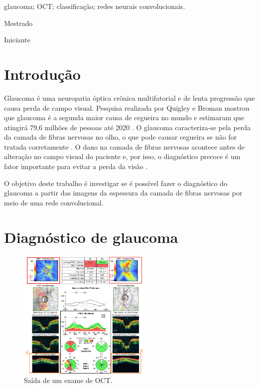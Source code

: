 \documentclass[conference]{IEEEtran}
\begin{document}
\renewcommand\IEEEkeywordsname{Palavras-chave}
\begin{IEEEkeywords}
\label{Palavras-chave}
glaucoma; OCT; classificação; redes neurais convolucionais.
\end{IEEEkeywords}

\renewcommand\IEEEkeywordsname{Classifica\c{c}\~{a}o}
\begin{IEEEkeywords}
	\label{classificacao}
	Mestrado
\end{IEEEkeywords}

\renewcommand\IEEEkeywordsname{Categoria}
\begin{IEEEkeywords}
	\label{Categoria}
	Iniciante 
\end{IEEEkeywords}

\IEEEpeerreviewmaketitle


\section{Introdução}


Glaucoma é uma neuropatia óptica crônica multifatorial e de lenta progressão que causa perda de campo visual. Pesquisa realizada por Quigley e Broman mostrou que glaucoma é a segunda maior causa de cegueira no mundo e estimaram que atingirá 79,6 milhões de pessoas até 2020 \cite{Quigley2006}. O glaucoma caracteriza-se pela perda da camada de fibras nervosas no olho, o que pode causar cegueira se não for tratada corretamente \cite{Quigley2011}. O dano na camada de fibras nervosas acontece antes de alteração no campo visual do paciente e, por isso, o diagnóstico precoce é um fator importante para evitar a perda da visão \cite{Malik2012}.

O objetivo deste trabalho é investigar se é possível fazer o diagnóstico do glaucoma a partir das imagens da espessura da camada de fibras nervosas por meio de uma rede convolucional.

\section{Diagnóstico de glaucoma}


\begin{figure}[!tp]
  \centering
  \includegraphics[width=2.5in]{img/oct_regiao.png}
  \caption{Saída de um exame de OCT.}
  \label{fig:oct}
\end{figure}
\end{document}
